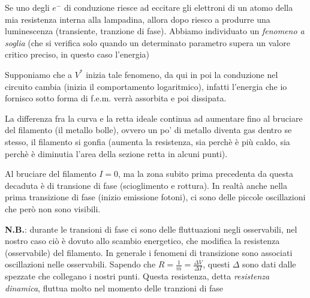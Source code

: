 \documentclass{article}
\begin{document}
Se uno degli $e^-$ di conduzione riesce ad eccitare gli elettroni di un atomo della mia resistenza interna alla lampadina, allora dopo riesco a produrre una luminescenza (transiente, tranzione di fase). 
Abbiamo individuato un \textit{fenomeno a soglia} (che si verifica solo quando un determinato parametro supera un valore critico preciso, in questo caso l'energia)

Supponiamo che a $V^*$ inizia tale fenomeno, da qui in poi la conduzione nel circuito cambia (inizia il comportamento logaritmico), infatti l'energia che io fornisco sotto forma di f.e.m. verrà assorbita e poi dissipata. 

La differenza fra la curva e la retta ideale continua ad aumentare fino al bruciare del filamento (il metallo bolle), ovvero un po' di metallo diventa gas dentro se stesso, 
il filamento si gonfia (aumenta la resistenza, sia perchè è più caldo, sia perchè è diminutia l'area della sezione retta in alcuni punti).

Al bruciare del filamento $I=0$, ma la zona subito prima precedenta da questa decaduta è di transione di fase (scioglimento e rottura). In realtà anche nella prima transizione di fase (inizio emissione fotoni), ci sono delle 
piccole oscillazioni che però non sono visibili. 

\textbf{N.B.}: durante le transioni di fase ci sono delle fluttuazioni negli osservabili, nel nostro caso ciò è dovuto allo scambio energetico, che modifica la resistenza (osservabile) del filamento.
In generale i fenomeni di transizione sono associati oscillazioni nelle osservabili. 
Sapendo che $R=\frac{1}{m}=\frac{\Delta V}{\Delta I}$, questi $\Delta$ sono dati dalle spezzate che collegano i nostri punti.
Questa resistenza, detta \textit{resistenza dinamica}, fluttua molto nel momento delle tranzioni di fase 





\begin{center}
\end{center}
\end{document}
